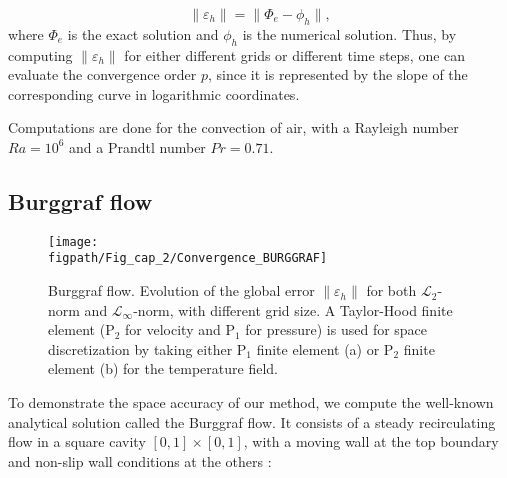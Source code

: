 \begin{equation}
  \| \varepsilon_h \| = \| \Phi_e - \phi_h \|,
\end{equation}
where $\Phi_e$ is the exact solution and $\phi_h$ is the numerical solution.
Thus, by computing $\| \varepsilon_h \|$ for either different grids or different time steps, one can evaluate the convergence order $p$, since it is represented by the slope of the corresponding curve in logarithmic coordinates.

Computations are done for the convection of air, with a Rayleigh number $Ra = 10^6$ and a Prandtl number $Pr = 0.71$.

\subsection{Burggraf flow} \label{subsub-conv-burg}

\begin{figure}
	\begin{center}
		\texttt{[image: \\figpath/Fig\_cap\_2/Convergence\_BURGGRAF]} 
	\end{center}
	\caption{Burggraf flow. Evolution of the global error $\| \varepsilon_h \|$ for both $\mathcal{L}_2$-norm and $\mathcal{L}_\infty$-norm, with different grid size. A Taylor-Hood finite element (P$_2$ for velocity and P$_1$ for pressure) is used for space discretization by taking either P$_1$ finite element (a) or P$_2$ finite element (b) for the temperature field.}
	\label{fig-conv-burggraf}
\end{figure}

To demonstrate the space accuracy of our method, we compute the well-known analytical solution called the Burggraf flow.
It consists of a steady recirculating flow in a square cavity $[ 0 , 1] \times [ 0 , 1]$, with a moving wall at the top boundary and non-slip wall conditions at the others :

